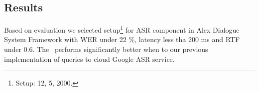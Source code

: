 %     
% 
% 
%     
%     
% 
% 
%     
% 
% 
%     
%     
% 

\subsection{Results}
\label{sec:results}
Based on evaluation we selected setup\footnote{Setup:  12,  5,  2000.} for ASR component in Alex Dialogue System Framework with  WER under 22 \%, latency less tha 200 ms and RTF under 0.6.
The~ performs significantly better when to our previous implementation of queries to cloud Google ASR service.

